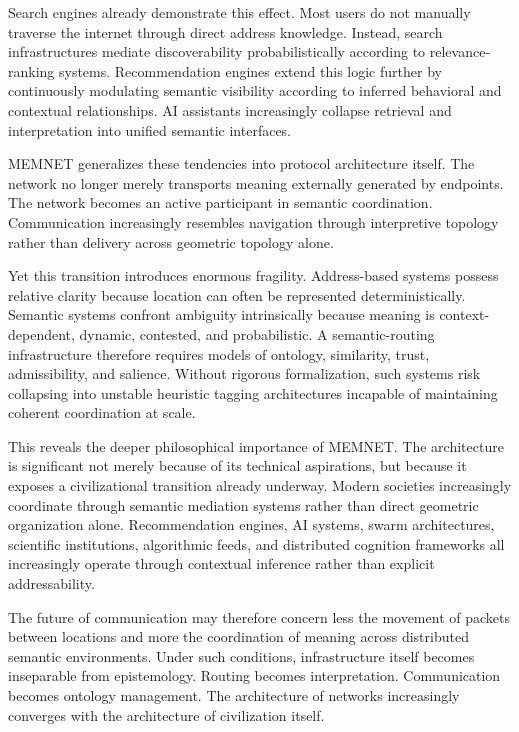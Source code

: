 \documentclass[11pt,a4paper]{article}
\begin{document}
Search engines already demonstrate this effect. Most users do not manually traverse the internet through direct address knowledge. Instead, search infrastructures mediate discoverability probabilistically according to relevance-ranking systems. Recommendation engines extend this logic further by continuously modulating semantic visibility according to inferred behavioral and contextual relationships. AI assistants increasingly collapse retrieval and interpretation into unified semantic interfaces.

MEMNET generalizes these tendencies into protocol architecture itself. The network no longer merely transports meaning externally generated by endpoints. The network becomes an active participant in semantic coordination. Communication increasingly resembles navigation through interpretive topology rather than delivery across geometric topology alone.

Yet this transition introduces enormous fragility. Address-based systems possess relative clarity because location can often be represented deterministically. Semantic systems confront ambiguity intrinsically because meaning is context-dependent, dynamic, contested, and probabilistic. A semantic-routing infrastructure therefore requires models of ontology, similarity, trust, admissibility, and salience. Without rigorous formalization, such systems risk collapsing into unstable heuristic tagging architectures incapable of maintaining coherent coordination at scale.

This reveals the deeper philosophical importance of MEMNET. The architecture is significant not merely because of its technical aspirations, but because it exposes a civilizational transition already underway. Modern societies increasingly coordinate through semantic mediation systems rather than direct geometric organization alone. Recommendation engines, AI systems, swarm architectures, scientific institutions, algorithmic feeds, and distributed cognition frameworks all increasingly operate through contextual inference rather than explicit addressability.

The future of communication may therefore concern less the movement of packets between locations and more the coordination of meaning across distributed semantic environments. Under such conditions, infrastructure itself becomes inseparable from epistemology. Routing becomes interpretation. Communication becomes ontology management. The architecture of networks increasingly converges with the architecture of civilization itself.
\end{document}

